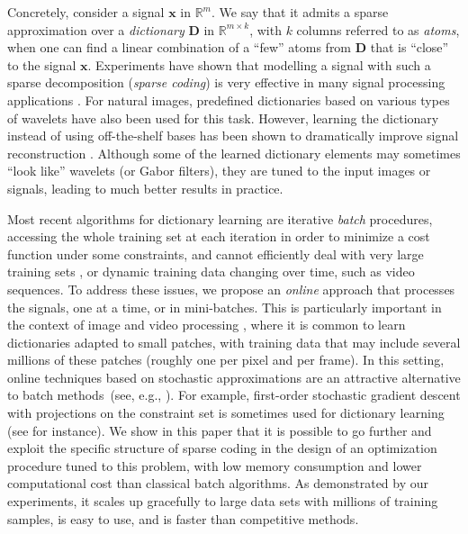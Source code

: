 \documentclass[twoside,11pt]{article}
\def\x{{\mathbf x}}
\def\D{{\mathbf D}}
\def\Real{{\mathbb R}}
\begin{document}
Concretely, consider a signal $\x$ in $\Real^m$. We say that it admits a
sparse approximation over a \mbox{{\em dictionary}} $\D$ in $\Real^{m \times k}$,
with $k$ columns referred to as {\em atoms}, when one can find a linear
combination of a ``few'' atoms from $\D$ that is ``close'' to the signal
$\x$.  Experiments have shown that modelling a signal with such a sparse
decomposition ({\em sparse coding}) is very effective in many signal
processing applications \citep{chen}.  For natural images, predefined
dictionaries based on various types of wavelets \citep{mallat} have also been used
for this task.  However, learning the dictionary instead of using
off-the-shelf bases has been shown to dramatically improve signal
reconstruction \citep{elad}.  Although some of the learned dictionary elements
may sometimes ``look like'' wavelets (or Gabor filters), they are tuned to the
input images or signals, leading to much better results in practice.

Most recent algorithms for dictionary
learning \citep{field,engan,lewicki,aharon,lee} are iterative
{\em batch} procedures, accessing the whole training set at each iteration in
order to minimize a cost function under some constraints, and cannot
efficiently deal with very large training sets \citep{bottou}, or dynamic
training data changing over time, such as video sequences. To address these
issues, we propose an {\em online} approach that processes the signals, one
at a time, or in mini-batches.  This is particularly important in the
context of image and video processing \citep{protter,mairal5}, where it is
common to learn dictionaries adapted to small patches, with training data
that may include several millions of these patches (roughly one per pixel and
per frame). In this setting, online techniques based on stochastic
approximations are an attractive alternative to batch
methods~(see, e.g., \citealp{bottou2,kushner,shwartz}).  For example, first-order stochastic gradient
descent with projections on the constraint set \citep{kushner} is sometimes
used for dictionary learning (see \citealp{aharon2,kavukcuoglu} for instance).
We show in this paper that it is possible to go further and exploit the
specific structure of sparse coding in the design of an optimization
procedure tuned to this problem, with low memory consumption and lower
computational cost than classical batch algorithms.  As demonstrated by our
experiments, it scales up gracefully to large data sets with millions of
training samples, is easy to use, and is faster than competitive methods.
\end{document}
